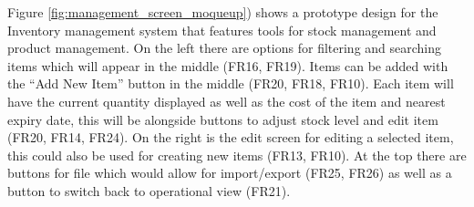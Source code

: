 Figure \ref{fig:management_screen_moqueup}) shows a prototype design for the Inventory management system that features tools for stock management and product management. On the left there are options for filtering and searching items which will appear in the middle (FR16, FR19). Items can be added with the “Add New Item” button in the middle (FR20, FR18, FR10). Each item will have the current quantity displayed as well as the cost of the item and nearest expiry date, this will be alongside buttons to adjust stock level and edit item (FR20, FR14, FR24). On the right is the edit screen for editing a selected item, this could also be used for creating new items (FR13, FR10). At the top there are buttons for file which would allow for import/export (FR25, FR26) as well as a button to switch back to operational view (FR21).